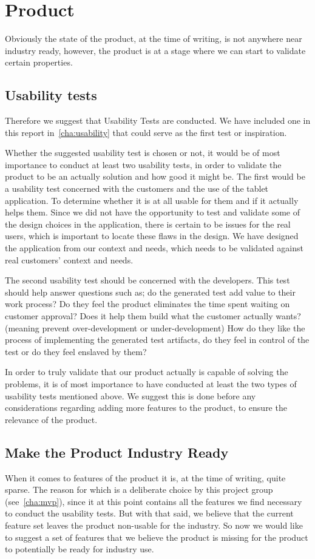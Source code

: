 \section{Product}
Obviously the state of the product, at the time of writing, is not anywhere near industry ready, however, the product is at a stage where we can start to validate certain properties.

\subsection{Usability tests}
Therefore we suggest that Usability Tests are conducted.
We have included one in this report in~\autoref{cha:usability} that could serve as the first test or inspiration.

Whether the suggested usability test is chosen or not, it would be of most importance to conduct at least two usability tests, in order to validate the product to be an actually solution and how good it might be.
The first would be a usability test concerned with the customers and the use of the tablet application.
To determine whether it is at all usable for them and if it actually helps them.
Since we did not have the opportunity to test and validate some of the design choices in the application, there is certain to be issues for the real users, which is important to locate these flaws in the design.
We have designed the application from our context and needs, which needs to be validated against real customers' context and needs.

The second usability test should be concerned with the developers.
This test should help answer questions such as; do the generated test add value to their work process? 
Do they feel the product eliminates the time spent waiting on customer approval?
Does it help them build what the customer actually wants? (meaning prevent over-development or under-development)
How do they like the process of implementing the generated test artifacts, do they feel in control of the test or do they feel enslaved by them?

In order to truly validate that our product actually is capable of solving the problems, it is of most importance to have conducted at least the two types of usability tests mentioned above.
We suggest this is done before any considerations regarding adding more features to the product, to ensure the relevance of the product.

\subsection{Make the Product Industry Ready}
When it comes to features of the product it is, at the time of writing, quite sparse.
The reason for which is a deliberate choice by this project group (see~\autoref{cha:mvp}), since it at this point contains all the features we find necessary to conduct the usability tests.
But with that said, we believe that the current feature set leaves the product non-usable for the industry.
So now we would like to suggest a set of features that we believe the product is missing for the product to potentially be ready for industry use.

